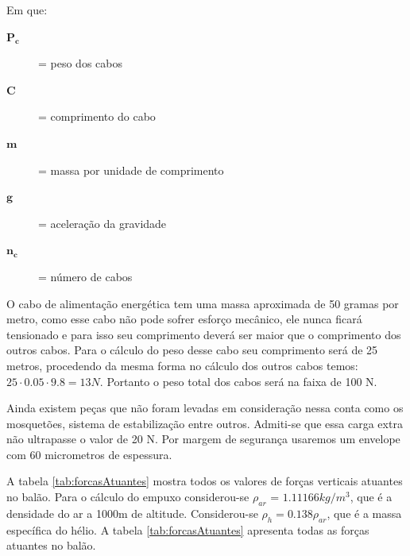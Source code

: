 Em que:
\begin{description}
	\item[$\boldsymbol{P_{c}}$] = peso dos cabos
	\item[$\boldsymbol{C}$] = comprimento do cabo
	\item[$\boldsymbol{m}$] = massa por unidade de comprimento
	\item[$\boldsymbol{g}$] = aceleração da gravidade
	\item[$\boldsymbol{n_{c}}$] = número de cabos
\end{description}

O cabo de alimentação energética tem uma massa aproximada de 50 gramas por metro, como esse cabo não pode sofrer esforço mecânico, ele nunca  ficará tensionado e para isso seu comprimento deverá ser maior que o comprimento dos outros cabos. Para o cálculo do peso desse cabo seu comprimento será de 25 metros, procedendo da mesma forma no cálculo dos outros cabos temos: $25 \cdot 0.05 \cdot 9.8 = 13 N$. Portanto o peso total dos cabos será na faixa de 100 N.

Ainda existem peças que não foram levadas em consideração nessa conta como os mosquetões, sistema de estabilização entre outros. Admiti-se que essa carga extra não ultrapasse o valor de 20 N. Por margem de segurança usaremos um envelope com 60 micrometros de espessura.

A tabela \ref{tab:forcasAtuantes} mostra todos os valores de forças verticais atuantes no balão. Para o cálculo do empuxo considerou-se $\rho_{ar}$ = $1.11166 kg/m^3$, que é a densidade do ar a 1000m de altitude. Considerou-se $\rho_{h} = 0.138 \rho_{ar}$, que é a massa específica do hélio. A tabela \ref{tab:forcasAtuantes} apresenta todas as forças atuantes no balão.

